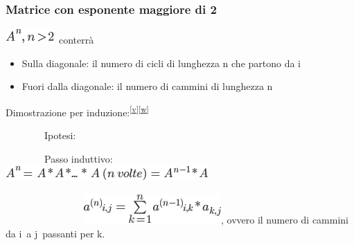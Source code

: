 \documentclass{article}
\providecommand{\tightlist}{%
  \setlength{\itemsep}{0pt}\setlength{\parskip}{0pt}}
\begin{document}
\hypertarget{h.yvqsj238z2mk}{\subsubsection{\texorpdfstring{{Matrice con
esponente maggiore di
2}}{Matrice con esponente maggiore di 2}}\label{h.yvqsj238z2mk}}

\includegraphics{images/image417.png}{~conterrà}

\begin{itemize}
\tightlist
\item
  {Sulla diagonale: il numero di cicli di lunghezza n che partono da i}
\item
  {Fuori dalla diagonale: il numero di cammini di lunghezza n}
\end{itemize}

{}

{Dimostrazione per
induzione:}\textsuperscript{\protect\hyperlink{cmnt22}{{[}v{]}}\protect\hyperlink{cmnt23}{{[}w{]}}}

{~~~~~~~~}{Ipotesi:}

{~~~~~~~~Passo induttivo:\\
\hspace*{0.333em}\hspace*{0.333em}\hspace*{0.333em}\hspace*{0.333em}\hspace*{0.333em}\hspace*{0.333em}\hspace*{0.333em}\hspace*{0.333em}\hspace*{0.333em}\hspace*{0.333em}\hspace*{0.333em}\hspace*{0.333em}\hspace*{0.333em}\hspace*{0.333em}\hspace*{0.333em}\hspace*{0.333em}}\includegraphics{images/image418.png}

{~~~~~~~~~~~~~~~~}\includegraphics{images/image419.png}{, ovvero il
numero di cammini da }{i}{~a }{j}{~passanti per }{k}{.}
\end{document}
